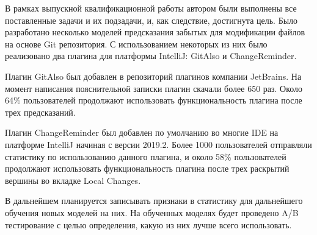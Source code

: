 В рамках выпускной квалификационной работы автором были выполнены все поставленные задачи и их подзадачи, и, как следствие, достигнута цель. Было разработано несколько моделей предсказания забытых для модификации файлов на основе Git репозитория. С использованием некоторых из них было реализовано два плагина для платформы IntelliJ: GitAlso и ChangeReminder. 

Плагин GitAlso был добавлен в репозиторий плагинов компании JetBrains. На момент написания пояснительной записки плагин скачали более 650 раз. Около 64\% пользователей продолжают использовать функциональность плагина после трех предсказаний. 

Плагин ChangeReminder был добавлен по умолчанию во многие IDE на платформе IntelliJ начиная с версии 2019.2. Более 1000 пользователей отправляли статистику по использованию данного плагина, и около 58\% пользователей продолжают использовать функциональность плагина после трех раскрытий вершины во вкладке Local Changes.

В дальнейшем планируется записывать признаки в статистику для дальнейшего обучения новых моделей на них. На обученных моделях будет проведено A/B тестирование с целью определения, какую из них лучше всего использовать.